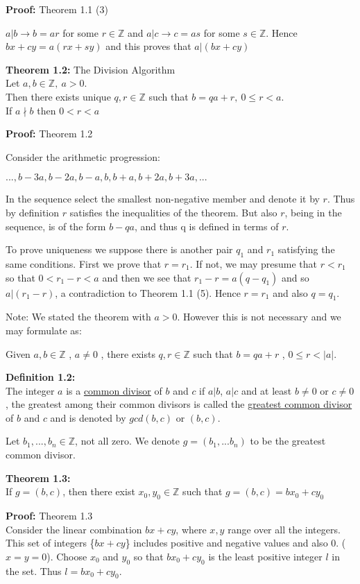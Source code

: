 \documentclass[a4paper]{article}
\begin{document}
\textbf{Proof:} Theorem 1.1 (3)

$a|b \rightarrow b=ar$ for some $r\in \mathbb{Z}$ and $a|c \rightarrow c=as$ for some $s\in \mathbb{Z}$. Hence $bx+cy=a(rx+sy)$ and this proves that $a|(bx+cy)$


\textbf{Theorem 1.2:} The Division Algorithm\\
Let $a,b\in\mathbb{Z},\ a>0$.\\
Then there exists unique $q,r\in\mathbb{Z}$ such that $b=qa+r,\ 0\leq r<a$.\\
If $a\nmid b$ then $0<r<a$

\textbf{Proof:} Theorem 1.2

Consider the arithmetic progression:

$...,b-3a,b-2a,b-a,b,b+a,b+2a,b+3a,...$

In the sequence select the smallest non-negative member and denote it by $r$. Thus by definition $r$ satisfies the inequalities of the theorem. But also $r$, being in the sequence, is of the form $b-qa$, and thus q is defined in terms of $r$.

To prove uniqueness we suppose there is another pair $q_1$ and $r_1$ satisfying the same conditions. First we prove that $r=r_1$. If not, we may presume that $r<r_1$ so that $0<r_1-r<a$ and then we see that $r_1-r=a(q-q_1)$ and so $a|(r_1-r)$, a contradiction to Theorem 1.1 (5). Hence $r=r_1$ and also $q=q_1$.

Note: We stated the theorem with $a>0$. However this is not necessary and we may formulate as:

Given $a,b\in\mathbb{Z}$ , $a\neq 0$ , there exists $q,r\in\mathbb{Z}$ such that $b=qa+r$ , $0\leq r < |a|$.


\textbf{Definition 1.2:}\\
The integer $a$ is a \underline{common divisor} of $b$ and $c$ if $a|b$, $a|c$ and at least $b\neq0$ or $c\neq0$, the greatest among their common divisors is called the \underline{greatest common divisor} of $b$ and $c$ and is denoted by $gcd(b,c)$ or $(b,c)$.

Let $b_1,...,b_n\in\mathbb{Z}$, not all zero. We denote $g=(b_1,...b_n)$ to be the greatest common divisor.

\textbf{Theorem 1.3:}\\
If $g=(b,c)$, then there exist $x_0,y_0\in\mathbb{Z}$ such that $g=(b,c)=bx_0+cy_0$

\textbf{Proof:} Theorem 1.3\\
Consider the linear combination $bx+cy$, where $x,y$ range over all the integers. This set of integers \{$bx+cy$\} includes positive and negative values and also 0. ($x=y=0$). Choose $x_0$ and $y_0$ so that $bx_0+cy_0$ is the least positive integer $l$ in the set. Thus $l=bx_0+cy_0$.
\end{document}
